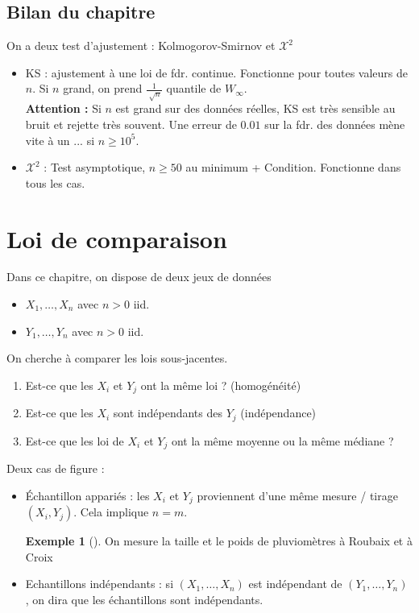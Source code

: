 \documentclass{article}
\theoremstyle{plain}%
\theoremstyle{definition}
\newtheorem{exmp}{Exemple}[section]
\theoremstyle{remark}
\begin{document}
\subsection{Bilan du chapitre}
On a deux test d'ajustement : Kolmogorov-Smirnov et $ \mathcal{X}^2 $ \begin{itemize}
    \item KS : ajustement à une loi de fdr. continue. Fonctionne pour toutes valeurs de $ n $. Si $ n $ grand, on prend $ \frac{1}{\sqrt[]{n}} $ quantile de $ W_\infty  $.\\
        \textbf{Attention : } Si $ n $ est grand sur des données réelles, KS est très sensible au bruit et rejette très souvent. Une erreur de $0.01$ sur la fdr. des données mène vite à un ... si $ n \geq 10^5 $.
    \item $ \mathcal{X}^2 $ : Test asymptotique, $ n \geq 50 $ au minimum + Condition. Fonctionne dans tous les cas.
\end{itemize}

\section{Loi de comparaison}
Dans ce chapitre, on dispose de deux jeux de données \begin{itemize}
    \item $ X_1, \dots, X_n $ avec $ n>0 $ iid.
    \item $ Y_1, \dots, Y_n $ avec $ n>0 $ iid.
\end{itemize}
On cherche à comparer les lois sous-jacentes. \begin{enumerate}
    \item Est-ce que les $ X_i $ et $ Y_j $ ont la même loi ? (homogénéité)
    \item Est-ce que les $ X_i $ sont indépendants des $ Y_j $ (indépendance)
    \item Est-ce que les loi de $ X_i $ et $ Y_j $ ont la même moyenne ou la même médiane ? 
\end{enumerate}
Deux cas de figure : 
\begin{itemize}
    \item Échantillon appariés : les $ X_i $ et $ Y_j $ proviennent d'une même mesure / tirage $ (X_i, Y_j) $. Cela implique $ n=m $. 
        \begin{exmp}[]
            On mesure la taille et le poids de pluviomètres à Roubaix et à Croix
        \end{exmp}
        
    \item Echantillons indépendants : si $ (X_1, \dots, X_n) $ est indépendant de $ (Y_1, \dots, Y_n) $ , on dira que les échantillons sont indépendants. 
\end{itemize}
\end{document}
